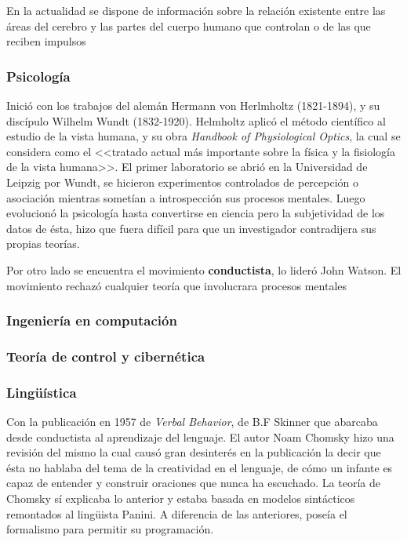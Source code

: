 \documentclass{article}
\begin{document}
En la actualidad se dispone de información sobre la relación existente entre las áreas del cerebro y las partes del cuerpo humano que controlan o de las que reciben impulsos

\subsubsection{Psicología}

Inició con los trabajos del alemán Hermann von Herlmholtz (1821-1894),  y su discípulo Wilhelm Wundt (1832-1920). Helmholtz aplicó el método científico al estudio de la vista humana, y su obra \textit{Handbook of Physiological Optics}, la cual se considera como el <<tratado actual más importante sobre la física y la fisiología de la vista humana>>. El primer laboratorio se abrió en la Universidad de Leipzig por Wundt, se hicieron experimentos controlados de percepción o asociación mientras sometían a introspección sus procesos mentales. Luego evolucionó la psicología hasta convertirse en ciencia pero la subjetividad de los datos de ésta, hizo que fuera difícil para que un investigador contradijera sus propias teorías.

Por otro lado se encuentra el movimiento \textbf{conductista}, lo lideró John Watson. El movimiento rechazó cualquier teoría que involucrara procesos mentales 

\subsubsection{Ingeniería en computación}

\subsubsection{Teoría de control y cibernética}

\subsubsection{Lingüística}
Con la publicación en 1957 de \textit{Verbal Behavior}, de B.F Skinner que abarcaba desde conductista al aprendizaje del lenguaje. El autor Noam Chomsky hizo una revisión del mismo la cual causó gran desinterés en la publicación la decir que ésta no hablaba del tema de la creatividad en el lenguaje, de cómo un infante es capaz de entender y construir oraciones que nunca ha escuchado. La teoría de Chomsky sí explicaba lo anterior y estaba basada en modelos sintácticos remontados al lingüista Panini. A diferencia de las anteriores, poseía el formalismo para permitir su programación.
\end{document}
